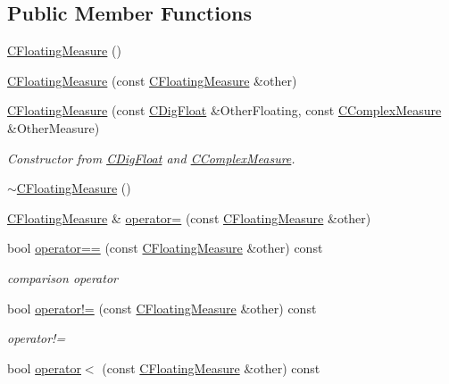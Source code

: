 \subsection*{Public Member Functions}
\begin{DoxyCompactItemize}
\item 
\hyperlink{classCFloatingMeasure_aa30b4d0ea6b6bbc022717c875419fb44}{C\+Floating\+Measure} ()
\item 
\hyperlink{classCFloatingMeasure_ac5f28ce988a77d1bc8b34b361827788c}{C\+Floating\+Measure} (const \hyperlink{classCFloatingMeasure}{C\+Floating\+Measure} \&other)
\item 
\hyperlink{classCFloatingMeasure_a8ce55143653895584c3f578103308714}{C\+Floating\+Measure} (const \hyperlink{classCDigFloat}{C\+Dig\+Float} \&Other\+Floating, const \hyperlink{classCComplexMeasure}{C\+Complex\+Measure} \&Other\+Measure)
\begin{DoxyCompactList}\small\item\em Constructor from \hyperlink{classCDigFloat}{C\+Dig\+Float} and \hyperlink{classCComplexMeasure}{C\+Complex\+Measure}. \end{DoxyCompactList}\item 
\hyperlink{classCFloatingMeasure_a43c9d00b7a9e66da291926f58459c7c8}{$\sim$\+C\+Floating\+Measure} ()
\item 
\hyperlink{classCFloatingMeasure}{C\+Floating\+Measure} \& \hyperlink{classCFloatingMeasure_a958ef3d71c3dd7355bebef272df5b9e0}{operator=} (const \hyperlink{classCFloatingMeasure}{C\+Floating\+Measure} \&other)
\item 
bool \hyperlink{classCFloatingMeasure_ab4233b1232751f99e9e1f91f2ee55cc9}{operator==} (const \hyperlink{classCFloatingMeasure}{C\+Floating\+Measure} \&other) const
\begin{DoxyCompactList}\small\item\em comparison operator \end{DoxyCompactList}\item 
bool \hyperlink{classCFloatingMeasure_afbedc9a56acac7c6738357ce2347aad3}{operator!=} (const \hyperlink{classCFloatingMeasure}{C\+Floating\+Measure} \&other) const
\begin{DoxyCompactList}\small\item\em operator!= \end{DoxyCompactList}\item 
bool \hyperlink{classCFloatingMeasure_a35d506664a6a72856d56cbf18ea9d2a4}{operator$<$} (const \hyperlink{classCFloatingMeasure}{C\+Floating\+Measure} \&other) const

\end{DoxyCompactItemize}
